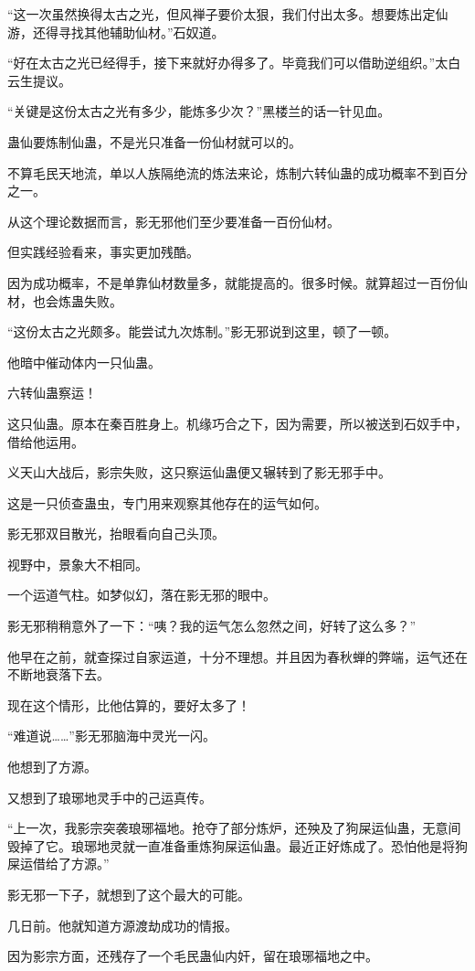 \begin{this_body}
“这一次虽然换得太古之光，但风禅子要价太狠，我们付出太多。想要炼出定仙游，还得寻找其他辅助仙材。”石奴道。

“好在太古之光已经得手，接下来就好办得多了。毕竟我们可以借助逆组织。”太白云生提议。

“关键是这份太古之光有多少，能炼多少次？”黑楼兰的话一针见血。

蛊仙要炼制仙蛊，不是光只准备一份仙材就可以的。

不算毛民天地流，单以人族隔绝流的炼法来论，炼制六转仙蛊的成功概率不到百分之一。

从这个理论数据而言，影无邪他们至少要准备一百份仙材。

但实践经验看来，事实更加残酷。

因为成功概率，不是单靠仙材数量多，就能提高的。很多时候。就算超过一百份仙材，也会炼蛊失败。

“这份太古之光颇多。能尝试九次炼制。”影无邪说到这里，顿了一顿。

他暗中催动体内一只仙蛊。

六转仙蛊察运！

这只仙蛊。原本在秦百胜身上。机缘巧合之下，因为需要，所以被送到石奴手中，借给他运用。

义天山大战后，影宗失败，这只察运仙蛊便又辗转到了影无邪手中。

这是一只侦查蛊虫，专门用来观察其他存在的运气如何。

影无邪双目散光，抬眼看向自己头顶。

视野中，景象大不相同。

一个运道气柱。如梦似幻，落在影无邪的眼中。

影无邪稍稍意外了一下：“咦？我的运气怎么忽然之间，好转了这么多？”

他早在之前，就查探过自家运道，十分不理想。并且因为春秋蝉的弊端，运气还在不断地衰落下去。

现在这个情形，比他估算的，要好太多了！

“难道说……”影无邪脑海中灵光一闪。

他想到了方源。

又想到了琅琊地灵手中的己运真传。

“上一次，我影宗突袭琅琊福地。抢夺了部分炼炉，还殃及了狗屎运仙蛊，无意间毁掉了它。琅琊地灵就一直准备重炼狗屎运仙蛊。最近正好炼成了。恐怕他是将狗屎运借给了方源。”

影无邪一下子，就想到了这个最大的可能。

几日前。他就知道方源渡劫成功的情报。

因为影宗方面，还残存了一个毛民蛊仙内奸，留在琅琊福地之中。


\end{this_body}
